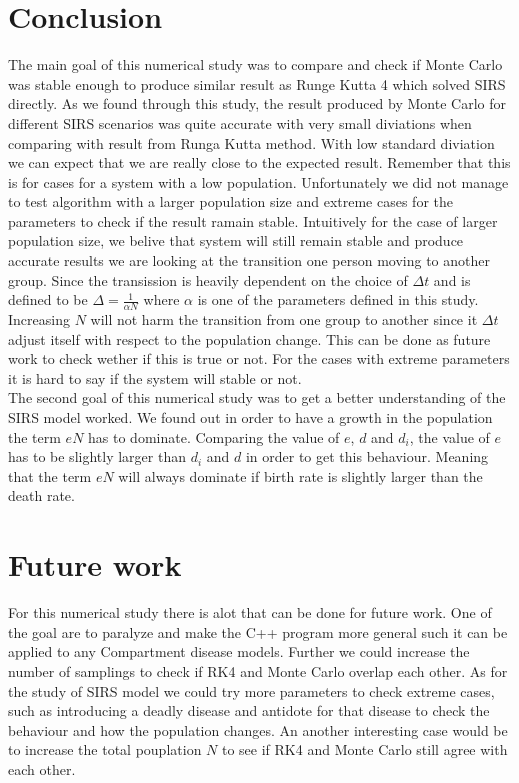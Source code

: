 \documentclass[a4paper, 10pt]{article}
\begin{document}
\section{Conclusion}
The main goal of this numerical study was to compare and check if Monte Carlo was stable enough to produce
similar result as Runge Kutta 4 which solved SIRS directly. As we found through this study, the result produced by Monte Carlo
for different SIRS scenarios
was quite accurate with very small diviations when comparing with result from Runga Kutta method.
With low standard diviation we can expect that we are really close to the expected result.
Remember that this is for cases for a system with a low population. Unfortunately we did not manage to test algorithm with a larger population size and extreme cases for the parameters
to check if the result ramain stable. Intuitively for the case of larger population size, we belive that system will still remain stable and produce
accurate results we are looking at the transition one person moving to another group. Since the transission is heavily dependent on the choice of
$\Delta t$ and is defined to be $\Delta = \frac{1}{\alpha N}$ where $\alpha$ is one of the parameters defined in this study.
Increasing $N$ will not harm the transition from one group to another since it $\Delta t$ adjust itself with respect to the population change.
This can be done as future work to check wether if this is true or not. For the cases with extreme parameters it is hard to say if the
system will stable or not.
\vspace{3mm}
\\
The second goal of this numerical study was to get a better understanding of the SIRS model worked.
We found out in order to have a growth in the population the term $eN$ has to dominate. Comparing the value of $e$, $d$ and $d_{i}$,
the value of $e$ has to be slightly larger than $d_{i}$ and $d$ in order to get this behaviour. Meaning that the term $eN$ will always dominate
if birth rate is slightly larger than the death rate.
\section{Future work}
For this numerical study there is alot that can be done for future work. One of the goal are to paralyze
and make the C++ program more general such it can be applied to any Compartment disease models.
Further we could increase the number of samplings to check if RK4 and Monte Carlo overlap each other.
As for the study of SIRS model we could try more parameters to check extreme cases, such as introducing a deadly disease
and antidote for that disease to check the behaviour and how the population changes. An another interesting case
would be to increase the total pouplation $N$ to see if RK4 and Monte Carlo still agree with each other.



\end{document}
